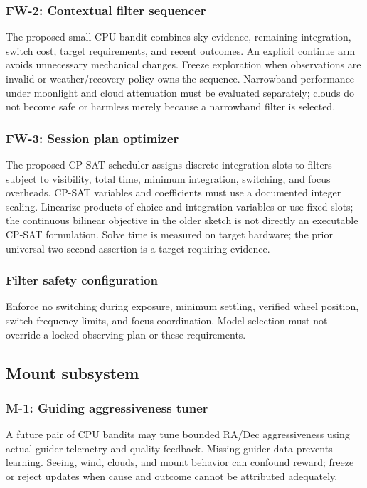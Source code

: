 \documentclass[11pt,a4paper]{article}
\begin{document}
\subsubsection{FW-2: Contextual filter sequencer}
The proposed small CPU bandit combines sky evidence, remaining integration,
switch cost, target requirements, and recent outcomes. An explicit continue arm
avoids unnecessary mechanical changes. Freeze exploration when observations
are invalid or weather/recovery policy owns the sequence. Narrowband performance
under moonlight and cloud attenuation must be evaluated separately; clouds do
not become safe or harmless merely because a narrowband filter is selected.

\subsubsection{FW-3: Session plan optimizer}
The proposed CP-SAT scheduler assigns discrete integration slots to filters
subject to visibility, total time, minimum integration, switching, and focus
overheads. CP-SAT variables and coefficients must use a documented integer
scaling. Linearize products of choice and integration variables or use fixed
slots; the continuous bilinear objective in the older sketch is not directly
an executable CP-SAT formulation. Solve time is measured on target hardware;
the prior universal two-second assertion is a target requiring evidence.

\subsubsection{Filter safety configuration}
Enforce no switching during exposure, minimum settling, verified wheel
position, switch-frequency limits, and focus coordination. Model selection
must not override a locked observing plan or these requirements.

\subsection{Mount subsystem}
\subsubsection{M-1: Guiding aggressiveness tuner}
A future pair of CPU bandits may tune bounded RA/Dec aggressiveness using
actual guider telemetry and quality feedback. Missing guider data prevents
learning. Seeing, wind, clouds, and mount behavior can confound reward; freeze
or reject updates when cause and outcome cannot be attributed adequately.
\end{document}
